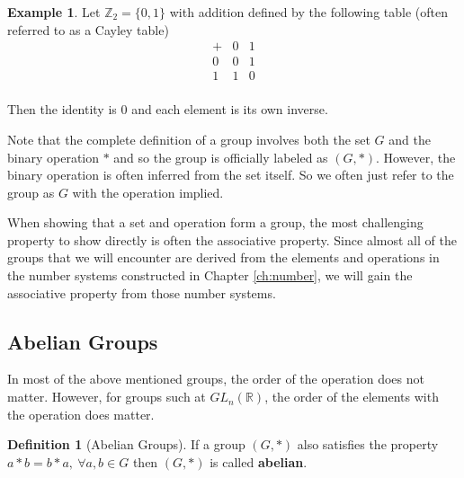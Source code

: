 \documentclass[
]{book}
\theoremstyle{definition}
\newtheorem{definition}{Definition}[chapter]
\theoremstyle{definition}
\newtheorem{example}{Example}[chapter]
\theoremstyle{definition}
\theoremstyle{remark}
\begin{document}
\begin{example}
\protect\hypertarget{exm:z2}{}{\label{exm:z2} }Let \(\mathbb{Z}_2=\{0,1\}\) with addition defined by the following table (often referred to as a Cayley table)
\[\begin{array}{c|cc}
+ & 0 & 1 \\ \hline
0 & 0 & 1 \\
1 & 1 & 0 \\
\end{array}\]

Then the identity is \(0\) and each element is its own inverse.
\end{example}

Note that the complete definition of a group involves both the set \(G\) and the binary operation \(*\) and so the group is officially labeled as \((G,*)\). However, the binary operation is often inferred from the set itself. So we often just refer to the group as \(G\) with the operation implied.

When showing that a set and operation form a group, the most challenging property to show directly is often the associative property. Since almost all of the groups that we will encounter are derived from the elements and operations in the number systems constructed in Chapter \ref{ch:number}, we will gain the associative property from those number systems.

\hypertarget{abelian-groups}{%
\subsection{Abelian Groups}\label{abelian-groups}}

In most of the above mentioned groups, the order of the operation does not matter. However, for groups such at \(GL_n(\mathbb{R})\), the order of the elements with the operation does matter.

\begin{definition}[Abelian Groups]
\protect\hypertarget{def:unnamed-chunk-152}{}{\label{def:unnamed-chunk-152} {} }If a group \((G,*)\) also satisfies the property \(a*b=b*a, \: \forall a,b\in G\)
then \((G,*)\) is called \textbf{abelian}.
\end{definition}
\end{document}
